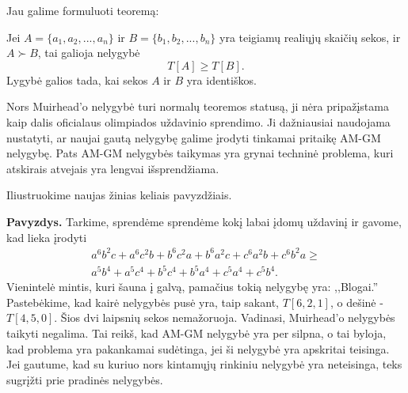 Jau galime formuluoti teoremą:

\begin{thm}[Muirhead]
  Jei $A=\{a_1,a_2,...,a_n\}$ ir $B=\{b_1,b_2,...,b_n\}$ yra teigiamų
  realiųjų skaičių sekos, ir $A\succ B$, tai galioja nelygybė
  $$T[A]\geq T[B].$$ Lygybė galios tada, kai sekos $A$ ir $B$ yra identiškos.
\end{thm}

\begin{pastaba} Nors Muirhead'o nelygybė turi normalų teoremos statusą, ji
  nėra pripažįstama kaip dalis oficialaus olimpiados uždavinio sprendimo.
  Ji dažniausiai naudojama nustatyti, ar naujai gautą nelygybę galime įrodyti
  tinkamai pritaikę AM-GM nelygybę. Pats AM-GM nelygybės taikymas yra grynai
  techninė problema, kuri atskirais atvejais yra lengvai išsprendžiama.
\end{pastaba}

Iliustruokime naujas žinias keliais pavyzdžiais.

\noindent \textbf{Pavyzdys.} Tarkime, sprendėme sprendėme kokį labai įdomų
uždavinį ir gavome, kad lieka įrodyti
\begin{eqnarray*}a^6b^2c+a^6c^2b+b^6c^2a+b^6a^2c+c^6a^2b+c^6b^2a\geq\\
  a^5b^4+a^5c^4+b^5c^4+b^5a^4+c^5a^4+c^5b^4.
\end{eqnarray*}
Vienintelė mintis, kuri šauna į galvą, pamačius tokią nelygybę yra: ,,Blogai.''
Pastebėkime, kad kairė nelygybės pusė yra, taip sakant, $T[6,2,1]$, o dešinė -
$T[4,5,0]$. Šios dvi laipsnių sekos nemažoruoja. Vadinasi, Muirhead'o nelygybės
taikyti negalima. Tai reikš, kad AM-GM nelygybė yra per silpna, o tai byloja, kad
problema yra pakankamai sudėtinga, jei ši nelygybė yra apskritai teisinga. Jei
gautume, kad su kuriuo nors kintamųjų rinkiniu nelygybė yra neteisinga, teks
sugrįžti prie pradinės nelygybės.

